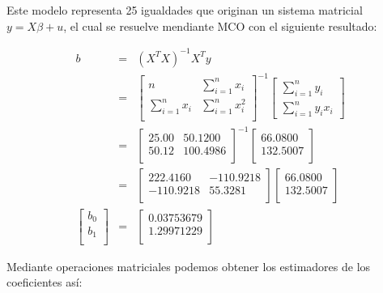 \documentclass[base=hide,12pt]{elegantbook}
\begin{document}
Este modelo representa 25 igualdades que originan un sistema matricial $y= X \beta + u$, el cual se resuelve mendiante MCO con el siguiente resultado: 

	\begin{eqnarray*}
		b&=&(X^{T}X)^{-1}X^{T}y \\
		&=&\begin{bmatrix}
			{n}     &{\displaystyle\sum_{i=1}^{n} x_{i}}\\
			{\displaystyle\sum_{i=1}^{n} x_{i}}&{\displaystyle\sum_{i=1}^{n} x^{2}_{i}}\\
		\end{bmatrix}^{-1}
		\begin{bmatrix}
			{\displaystyle\sum_{i=1}^{n} y_{i}}\\
			{\displaystyle\sum_{i=1}^{n} y_{i}x_{i}}
		\end{bmatrix}      \\
		&=& 
		\begin{bmatrix}
			{25.00}  &{50.1200}\\
			{50.12}  &{100.4986}\\
		\end{bmatrix} ^{-1}
		\begin{bmatrix}
			{66.0800}\\
			{132.5007}\\
		\end{bmatrix}\\
		&=&
		\begin{bmatrix}
			{222.4160} &  {-110.9218}\\
			{-110.9218}&  { 55.3281}\\
		\end{bmatrix}
		\begin{bmatrix}
			{66.0800}\\
			{132.5007}\\
		\end{bmatrix}\\
		\begin{bmatrix}
			{b_{0}}\\
			{b_{1}}\\
		\end{bmatrix}&=&
		\begin{bmatrix}
			{0.03753679}\\
			{1.29971229}\\
		\end{bmatrix}
	\end{eqnarray*}
	
Mediante operaciones matriciales podemos obtener los estimadores de los coeficientes así:
	
\end{document}
